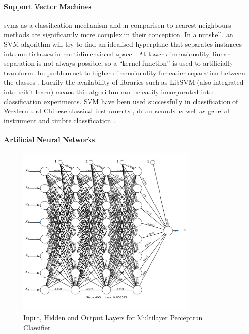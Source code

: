 {{{{\paragraph{Support Vector Machines} 

\acrfull{svm}s as a classification mechanism and in comparison to nearest neighbours methods are significantly more complex in their conception. In a nutshell, an SVM algorithm will try to find an idealised hyperplane that separates instances into multiclasses in multidimensional space \citep{Chang2008}. At lower dimensionality, linear separation is not always possible, so a ``kernel function'' is used to artificially transform the problem set to higher dimensionality for easier separation between the classes \citep{Xu2003}. Luckily the availability of libraries such as LibSVM \citep{Chang2011} (also integrated into scikit-learn) means this algorithm can be easily incorporated into classification experiments. SVM have been used successfully in classification of Western and Chinese classical instruments \citep{Liu2010a}, drum sounds \citep{Herrera2002, Herrera2003} as well as general instrument and timbre classification \citep{Herrera-Boyer2003, Krey2010, Agostini2003, Deng2008}.

\paragraph{Artificial Neural Networks}

\begin{figure}
	\begin{center}
		\includegraphics[width=0.8\textwidth]{ch05_pyconcat/figures/neural_network.pdf}
	\end{center}
	\caption[Input, Hidden and Output Layers for Multilayer Perceptron Classifier]{Input, Hidden and Output Layers for Multilayer Perceptron Classifier}
	\label{fig:neural_net}
\end{figure}

}}}}
